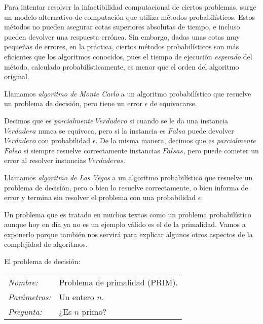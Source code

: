 Para intentar resolver la infactibilidad computacional de ciertos problemas, surge un modelo alternativo de computación que utiliza métodos probabilísticos. Estos métodos no pueden asegurar cotas superiores absolutas de tiempo, e incluso pueden devolver una respuesta errónea. Sin embargo, dadas unas cotas muy pequeñas de errores, en la práctica, ciertos métodos probabilísticos son más eficientes que los algoritmos conocidos, pues el tiempo de ejecución \textit{esperado} del método, calculado probabilísticamente, es menor que el orden del algoritmo original.



\begin{definition}
	Llamamos \textit{algoritmo de Monte Carlo} a un algoritmo probabilístico que resuelve un problema de decisión, pero tiene un error $\epsilon$ de equivocarse.

	Decimos que es \textit{parcialmente} $Verdadero$ si cuando se le da una instancia $Verdadera$ nunca se equivoca, pero si la instancia es $Falsa$ puede devolver $Verdadero$ con probabilidad $\epsilon$. De la misma manera, decimos que es \textit{parcialmente} $Falso$ si siempre resuelve correctamente instancias $Falsas$, pero puede cometer un error al resolver instancias $Verdaderas$.
\end{definition}


\begin{definition}
	Llamamos \textit{algoritmo de Las Vegas} a un algoritmo probabilístico que resuelve un problema de decisión, pero o bien lo resuelve correctamente, o bien informa de error y termina sin resolver el problema con una probabilidad $\epsilon$.
\end{definition}

Un problema que es tratado en muchos textos como un problema probabil\'istico aunque hoy en d\'ia ya no es un ejemplo v\'alido es el de la primalidad. Vamos a exponerlo porque tambi\'en nos servir\'a para explicar algunos otros aspectos de la complejidad de algoritmos.

\begin{example}
	El problema de decisión:

	\begin{tabular}{|ll}
		\textit{Nombre:} & Problema de primalidad (PRIM). \\
		\textit{Parámetros:} & Un entero $n$. \\
		\textit{Pregunta:} & ¿Es $n$ primo? \\
	\end{tabular}
	\\
	\hfil
\end{example}

